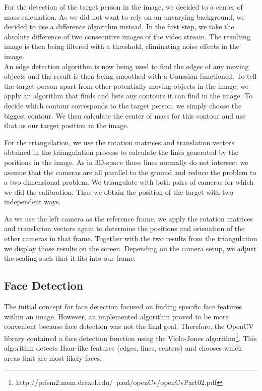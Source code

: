 \documentclass{acm_proc_article-sp}
\begin{document}
For the detection of the target person in the image, we decided to a center of mass calculation. As we did not want to rely on an unvarying background, we decided to use a difference algorithm instead. In the first step, we take the absolute difference of two consecutive images of the video stream. The resulting image is then being filtered with a threshold, eliminating noise effects in the image.\\
An edge detection algorithm is now being used to find the edges of any moving objects and the result is then being smoothed with a Gaussian functioned. To tell the target person apart from other potentially moving objects in the image, we apply an algorithm that finds and lists any contours it can find in the image. To decide which contour corresponds to the target person, we simply choose the biggest contour. We then calculate the center of mass for this contour and use that as our target position in the image.

For the triangulation, we use the rotation matrices and translation vectors obtained in the triangulation process to calculate the lines generated by the positions in the image. As in 3D-space those lines normally do not intersect we assume that the cameras are all parallel to the ground and reduce the problem to a two dimensional problem. We triangulate with both pairs of cameras for which we did the calibration. Thus we obtain the position of the target with two independent ways.

As we use the left camera as the reference frame, we apply the rotation matrices and translation vectors again to determine the positions and orienation of the other cameras in that frame. Together with the two results from the triangulation we display those results on the screen. Depending on the camera setup, we adjust the scaling such that it fits into our frame.

\subsection{Face Detection}
The initial concept for face detection focused on finding specific face features within an image.  
However, an implemented algorithm proved to be more convenient because face detection was not the final goal.  
Therefore, the OpenCV library contained a face detection function using the Viola-Jones algorithm\footnote{http://prism2.mem.drexel.edu/~paul/openCv/openCvPart02.pdf}.
This algorithm detects Haar-like features (edges, lines, centers) and chooses which areas that are most likely faces.
	
\end{document}

